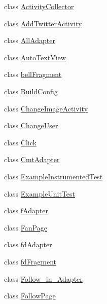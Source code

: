 \begin{DoxyCompactItemize}
\item 
class \mbox{\hyperlink{classcom_1_1example_1_1twitter_1_1_activity_collector}{Activity\+Collector}}
\item 
class \mbox{\hyperlink{classcom_1_1example_1_1twitter_1_1_add_twitter_activity}{Add\+Twitter\+Activity}}
\item 
class \mbox{\hyperlink{classcom_1_1example_1_1twitter_1_1_all_adapter}{All\+Adapter}}
\item 
class \mbox{\hyperlink{classcom_1_1example_1_1twitter_1_1_auto_text_view}{Auto\+Text\+View}}
\item 
class \mbox{\hyperlink{classcom_1_1example_1_1twitter_1_1bell_fragment}{bell\+Fragment}}
\item 
class \mbox{\hyperlink{classcom_1_1example_1_1twitter_1_1_build_config}{Build\+Config}}
\item 
class \mbox{\hyperlink{classcom_1_1example_1_1twitter_1_1_change_image_activity}{Change\+Image\+Activity}}
\item 
class \mbox{\hyperlink{classcom_1_1example_1_1twitter_1_1_change_user}{Change\+User}}
\item 
class \mbox{\hyperlink{classcom_1_1example_1_1twitter_1_1_click}{Click}}
\item 
class \mbox{\hyperlink{classcom_1_1example_1_1twitter_1_1_cmt_adapter}{Cmt\+Adapter}}
\item 
class \mbox{\hyperlink{classcom_1_1example_1_1twitter_1_1_example_instrumented_test}{Example\+Instrumented\+Test}}
\item 
class \mbox{\hyperlink{classcom_1_1example_1_1twitter_1_1_example_unit_test}{Example\+Unit\+Test}}
\item 
class \mbox{\hyperlink{classcom_1_1example_1_1twitter_1_1f_adapter}{f\+Adapter}}
\item 
class \mbox{\hyperlink{classcom_1_1example_1_1twitter_1_1_fan_page}{Fan\+Page}}
\item 
class \mbox{\hyperlink{classcom_1_1example_1_1twitter_1_1fd_adapter}{fd\+Adapter}}
\item 
class \mbox{\hyperlink{classcom_1_1example_1_1twitter_1_1fd_fragment}{fd\+Fragment}}
\item 
class \mbox{\hyperlink{classcom_1_1example_1_1twitter_1_1_follow__in___adapter}{Follow\+\_\+in\+\_\+\+Adapter}}
\item 
class \mbox{\hyperlink{classcom_1_1example_1_1twitter_1_1_follow_page}{Follow\+Page}}
\item 

\end{DoxyCompactItemize}
